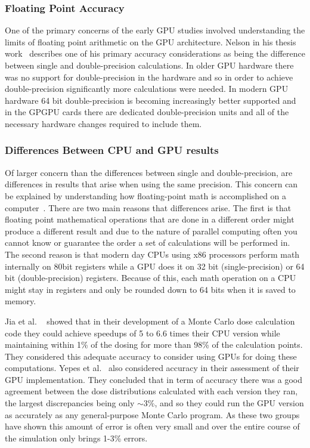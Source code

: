 \subsubsection*{\textbf{Floating Point Accuracy}}

One of the primary concerns of the early GPU studies involved understanding the limits of floating point arithmetic on the GPU architecture.
%
Nelson in his thesis work~\cite{nelson2009monte} describes one of his primary accuracy considerations as being the difference between single and double-precision calculations.
%
In older GPU hardware there was no support for double-precision in the hardware and so in order to achieve double-precision significantly more calculations were needed.
%
In modern GPU hardware 64 bit double-precision is becoming increasingly better supported and in the GPGPU cards there are dedicated double-precision units and all of the necessary hardware changes required to include them.
%

\subsubsection*{\textbf{Differences Between CPU and GPU results}}

Of larger concern than the differences between single and double-precision, are differences in results that arise when using the same precision.
%
This concern can be explained by understanding how floating-point math is accomplished on a computer~\cite{goldberg1991every}.
%
There are two main reasons that differences arise.
%
The first is that floating point mathematical operations that are done in a different order might produce a different result and due to the nature of parallel computing often you cannot know or guarantee the order a set of calculations will be performed in.
%
The second reason is that modern day CPUs using x86 processors perform math internally on 80bit registers while a GPU does it on 32 bit (single-precision) or 64 bit (double-precision) registers.
%
Because of this, each math operation on a CPU might stay in registers and only be rounded down to 64 bits when it is saved to memory.
%

%
Jia et al. ~\cite{jia2010development} showed that in their development of a Monte Carlo dose calculation code they could achieve speedups of 5 to 6.6 times their CPU version while maintaining within 1\% of the dosing for more than 98\% of the calculation points.
%
They considered this adequate accuracy to consider using GPUs for doing these computations.
%
Yepes et al.~\cite{yepes2010gpu} also considered accuracy in their assessment of their GPU implementation.
%
They concluded that in term of accuracy there was a good agreement between the dose distributions calculated with each version they ran, the largest discrepancies being only $\sim$3\%, and so they could run the GPU version as accurately as any general-purpose Monte Carlo program.
%
As these two groups have shown this amount of error is often very small and over the entire course of the simulation only brings 1-3\% errors.

